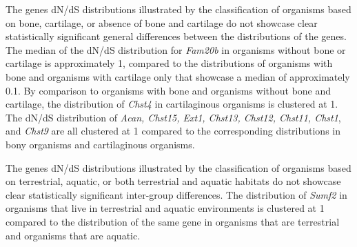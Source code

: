 \documentclass{article}
\begin{document}
The genes dN/dS distributions illustrated by the classification of organisms based on bone, cartilage, or absence of bone and cartilage do not showcase clear statistically significant general differences between the distributions of the genes. The median of the dN/dS distribution for \textit{Fam20b} in organisms without bone or cartilage is approximately 1, compared to the distributions of organisms with bone and organisms with cartilage only that showcase a median of approximately 0.1. By comparison to organisms with bone and organisms without bone and cartilage, the distribution of \textit{Chst4} in cartilaginous organisms is clustered at 1. The dN/dS distribution of \textit{Acan, Chst15, Ext1, Chst13, Chst12, Chst11, Chst1}, and \textit{Chst9} are all clustered at 1 compared to the corresponding distributions in bony organisms and cartilaginous organisms. 

The genes dN/dS distributions illustrated by the classification of organisms based on terrestrial, aquatic, or both terrestrial and aquatic habitats do not showcase clear statistically significant inter-group differences. The distribution of \textit{Sumf2} in organisms that live in terrestrial and aquatic environments is clustered at 1 compared to the distribution of the same gene in organisms that are terrestrial and organisms that are aquatic. 
\end{document}
